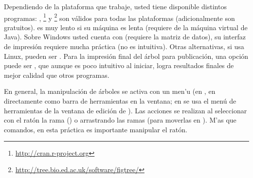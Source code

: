 Dependiendo de la plataforma que trabaje, usted tiene disponible distintos programas: , \footnote{\url{http://cran.r-project.org}} y \footnote{\url{http://tree.bio.ed.ac.uk/software/figtree/}} son v\'alidos para todas las plataformas (adicionalmente son gratuitos).  es muy lento si su m\'aquina es lenta (requiere de la m\'aquina virtual de Java). Sobre Windows usted cuenta con  (requiere la matriz de datos), su interfaz de impresi\'on requiere mucha pr\'actica (no es intuitiva). Otras alternativas, si usa Linux, pueden ser . Para la impresi\'on final del \'arbol para publicaci\'on, una opci\'on puede ser , que aunque es poco intuitivo al iniciar, logra resultados finales de mejor calidad que otros programas.

En general, la manipulaci\'on de \'arboles se activa con un men'u (en  , en  directamente como barra de herramientas en la ventana; en  se usa el men\'u de herramientas de la ventana de edici\'on de ). Las acciones se realizan al seleccionar con el rat\'on la rama () o arrastrando las ramas (para moverlas en ). M'as que comandos, en esta pr\'actica es importante manipular el rat\'on.



